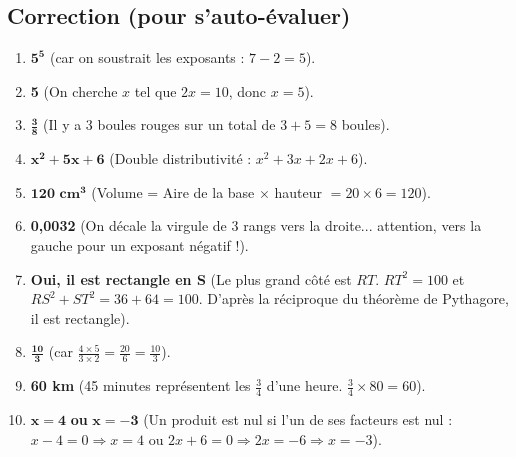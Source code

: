 \documentclass[a4paper,11pt]{article}
\begin{document}
\subsection*{Correction (pour s'auto-évaluer)}
\begin{enumerate}[label=\textbf{\arabic*.}]
    \item $\mathbf{5^5}$ (car on soustrait les exposants : $7 - 2 = 5$).
    \item \textbf{5} (On cherche $x$ tel que $2x = 10$, donc $x = 5$).
    \item $\mathbf{\frac{3}{8}}$ (Il y a 3 boules rouges sur un total de $3 + 5 = 8$ boules).
    \item $\mathbf{x^2 + 5x + 6}$ (Double distributivité : $x^2 + 3x + 2x + 6$).
    \item $\mathbf{120\text{ cm}^3}$ (Volume = Aire de la base $\times$ hauteur $= 20 \times 6 = 120$).
    \item \textbf{0,0032} (On décale la virgule de 3 rangs vers la droite... attention, vers la gauche pour un exposant négatif !).
    \item \textbf{Oui, il est rectangle en S} (Le plus grand côté est $RT$. $RT^2 = 100$ et $RS^2 + ST^2 = 36 + 64 = 100$. D'après la réciproque du théorème de Pythagore, il est rectangle).
    \item $\mathbf{\frac{10}{3}}$ (car $\frac{4 \times 5}{3 \times 2} = \frac{20}{6} = \frac{10}{3}$).
    \item \textbf{60 km} (45 minutes représentent les $\frac{3}{4}$ d'une heure. $\frac{3}{4} \times 80 = 60$).
    \item $\mathbf{x = 4}$ \textbf{ou} $\mathbf{x = -3}$ (Un produit est nul si l'un de ses facteurs est nul : $x - 4 = 0 \Rightarrow x = 4$ ou $2x + 6 = 0 \Rightarrow 2x = -6 \Rightarrow x = -3$).
\end{enumerate}
\end{document}
